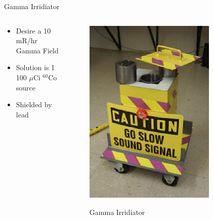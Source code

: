\begin{frame}{Gamma Irridiator}
\begin{columns}[onlytextwidth]
\begin{column}{0.45\textwidth}
	\begin{itemize}
		\item Desire a 10 mR/hr Gamma Field
		\item Solution is 1 100 $\mu$Ci ${}^{60}$Co source
		\item Shielded by lead
	\end{itemize}
\end{column}
\begin{column}{0.45\textwidth}
	\centering
	\begin{figure}
		\includegraphics[width=0.8\textwidth]{images/GammaIrridiator.eps}
		\label{fig:GammaIrridiator}
		\caption{Gamma Irridiator}
	\end{figure}
\end{column}
\end{columns}
\end{frame}

